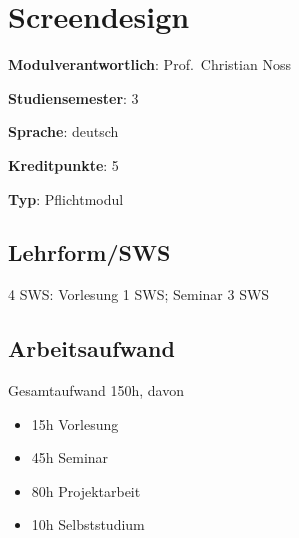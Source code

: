 \hypertarget{screendesignpathlabelmi-2017modulbeschreibungen-bachelorba_screendesign}{%
\chapter{Screendesign\label{/mi-2017/modulbeschreibungen-bachelor/BA_Screendesign}}\label{screendesignpathlabelmi-2017modulbeschreibungen-bachelorba_screendesign}}

\begin{modulHead}
\textbf{Modulverantwortlich}: Prof.~Christian
Noss
\end{modulHead}
\begin{modulHead}
\textbf{Studiensemester}:
3
\end{modulHead}
\begin{modulHead}
\textbf{Sprache}:
deutsch
\end{modulHead}
\begin{modulHead}
\textbf{Kreditpunkte}:
5
\end{modulHead}
\begin{modulHead}
\textbf{Typ}:
Pflichtmodul
\end{modulHead}


\hypertarget{lehrformswspathlabelmi-2017modulbeschreibungen-bachelorba_screendesign}{%
\section*{Lehrform/SWS\label{/mi-2017/modulbeschreibungen-bachelor/BA_Screendesign}}\label{lehrformswspathlabelmi-2017modulbeschreibungen-bachelorba_screendesign}}

4 SWS: Vorlesung 1 SWS; Seminar 3 SWS

\hypertarget{arbeitsaufwandpathlabelmi-2017modulbeschreibungen-bachelorba_screendesign}{%
\section*{Arbeitsaufwand\label{/mi-2017/modulbeschreibungen-bachelor/BA_Screendesign}}\label{arbeitsaufwandpathlabelmi-2017modulbeschreibungen-bachelorba_screendesign}}

Gesamtaufwand 150h, davon

\begin{itemize}
\tightlist
\item
  15h Vorlesung
\item
  45h Seminar
\item
  80h Projektarbeit
\item
  10h Selbststudium
\end{itemize}

